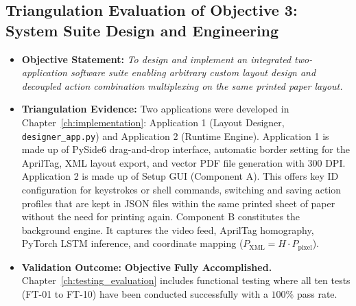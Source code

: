 \subsection{Triangulation Evaluation of Objective 3: System Suite Design and Engineering}
\label{sec:concl_obj3}
\begin{itemize}
    \item \textbf{Objective Statement:} \emph{To design and implement an integrated two-application software suite enabling arbitrary custom layout design and decoupled action combination multiplexing on the same printed paper layout.}
    \item \textbf{Triangulation Evidence:} Two applications were developed in Chapter~\ref{ch:implementation}: Application 1 (Layout Designer, \texttt{designer\_app.py}) and Application 2 (Runtime Engine). Application 1 is made up of PySide6 drag-and-drop interface, automatic border setting for the AprilTag, XML layout export, and vector PDF file generation with 300 DPI. Application 2 is made up of Setup GUI (Component A). This offers key ID configuration for keystrokes or shell commands, switching and saving action profiles that are kept in JSON files within the same printed sheet of paper without the need for printing again. Component B constitutes the background engine. It captures the video feed, AprilTag homography, PyTorch LSTM inference, and coordinate mapping ($P_{\text{XML}} = H \cdot P_{\text{pixel}}$).
    \item \textbf{Validation Outcome:} \textbf{Objective Fully Accomplished.} Chapter~\ref{ch:testing_evaluation} includes functional testing where all ten tests (FT-01 to FT-10) have been conducted successfully with a $100\%$ pass rate.
\end{itemize}

